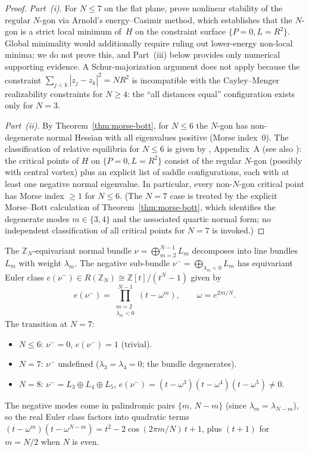 \begin{proof}
\emph{Part~(i).}
For $N \le 7$ on the flat plane, \citet{KurakinYudovich2002}
prove nonlinear stability of the regular $N$-gon via Arnold's
energy--Casimir method, which establishes that the $N$-gon
is a strict local minimum of~$H$ on the constraint surface
$\{P = 0, L = R^2\}$.
Global minimality would additionally require ruling out
lower-energy non-local minima; we do not prove this, and
Part~(iii) below provides only numerical supporting evidence.
A Schur-majorization argument does not apply because the
constraint $\sum_{j<k}|z_j - z_k|^2 = NR^2$ is incompatible
with the Cayley--Menger realizability constraints for
$N \ge 4$: the ``all distances equal'' configuration exists
only for $N = 3$.

\emph{Part~(ii).}
By Theorem~\ref{thm:morse-bott}, for $N \le 6$ the
$N$-gon has non-degenerate normal Hessian with all
eigenvalues positive (Morse index~$0$).
The classification of relative equilibria for
$N \le 6$ is given by \citealt{Aref2003}, Appendix~A
(see also \citealt{LimMontaldiRoberts2001}):
the critical points of $H$ on $\{P = 0, L = R^2\}$
consist of the regular $N$-gon (possibly with central
vortex) plus an explicit list of saddle configurations,
each with at least one negative normal eigenvalue.
In particular, every non-$N$-gon critical point has
Morse index $\ge 1$ for $N \le 6$.
(The $N = 7$ case is treated by the explicit Morse--Bott
calculation of Theorem~\ref{thm:morse-bott}, which
identifies the degenerate modes $m \in \{3, 4\}$ and
the associated quartic normal form; no independent
classification of all critical points for $N = 7$ is
invoked.)
\end{proof}

\begin{corollary}
\label{cor:euler-class}
The $\mathbb{Z}_N$-equivariant normal bundle
$\nu = \bigoplus_{m=2}^{N-1} L_m$
decomposes into line bundles $L_m$ with weight $\lambda_m$.
The negative sub-bundle
$\nu^- = \bigoplus_{\lambda_m < 0} L_m$
has equivariant Euler class
$e(\nu^-) \in R(\mathbb{Z}_N) \cong
\mathbb{Z}[t]/(t^N{-}1)$
given by
\[
  e(\nu^-) =
  \prod_{\substack{m = 2 \\ \lambda_m < 0}}^{N-1}
  (t - \omega^m),
  \qquad \omega = e^{2\pi i/N}.
\]
The transition at $N = 7$:
\begin{itemize}
\item $N \le 6$: $\nu^- = 0$, $e(\nu^-) = 1$ (trivial).
\item $N = 7$: $\nu^-$ undefined
  ($\lambda_3 = \lambda_4 = 0$; the bundle degenerates).
\item $N = 8$: $\nu^- = L_3 \oplus L_4 \oplus L_5$,
  $e(\nu^-) = (t{-}\omega^3)(t{-}\omega^4)(t{-}\omega^5)
  \ne 0$.
\end{itemize}
The negative modes come in palindromic pairs
$\{m,\, N{-}m\}$ (since $\lambda_m = \lambda_{N-m}$),
so the real Euler class factors into quadratic terms
$(t - \omega^m)(t - \omega^{N-m})
= t^2 - 2\cos(2\pi m/N)\,t + 1$,
plus $(t + 1)$ for $m = N/2$ when $N$ is even.
\end{corollary}

